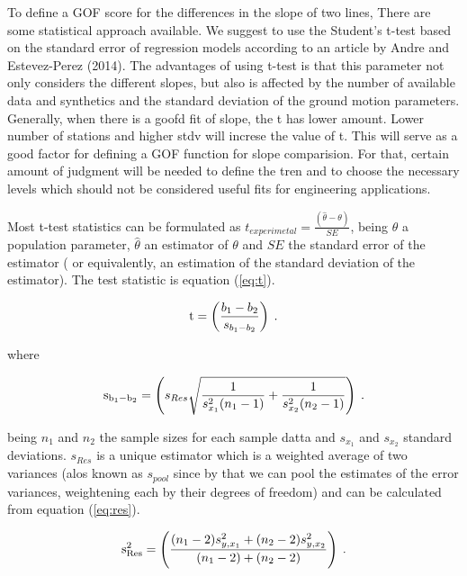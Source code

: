 To define a GOF score for the differences in the slope of two lines, There are some statistical approach available. We suggest to use the Student's t-test based on the standard error of regression models according to an article by Andre and Estevez-Perez (2014). The advantages of using t-test is that this parameter not only considers the different slopes, but also is affected by the number of available data and synthetics and the standard deviation of the ground motion parameters. Generally, when there is a goofd fit of slope, the t has lower amount. Lower number of stations and higher stdv will increse the value of t. This will serve as a good factor for defining a GOF function for slope comparision. For that, certain amount of judgment will be needed to define the tren and to choose the necessary levels which should not be considered useful fits for engineering applications.

Most t-test statistics can be formulated as $t_{experimetal}= \frac{(\hat{\theta}-\theta)}{SE}$, being $\theta$ a population parameter, $\hat{\theta}$ an estimator of ${\theta}$ and $SE$ the standard error of the estimator ( or equivalently, an estimation of the standard deviation of the estimator). The test statistic is equation (\ref{eq:t}).

%
\begin{equation}
	\mathrm{t} = \left( 
		\frac{b_1 - b_2}{s_{b_1-b_2}}
	\right)
	\hspace{0.25em}.
	\label{eq:t}
\end{equation}

where

%
\begin{equation}
	\mathrm{s_{b_1-b_2}} = \left( 
		s_{Res}\sqrt{\frac{1}{s_{x_1}^2(n_1-1)}+\frac{1}{s_{x_2}^2(n_2-1)}}
	\right)
	\hspace{0.25em}.
	\label{eq:sbb}
\end{equation}

being $n_1$ and $n_2$ the sample sizes for each sample datta and $s_{x_1}$ and $s_{x_2}$ standard deviations. $s_{Res}$ is a unique estimator which is a weighted average of two variances (alos known as $s_{pool}$ since by that we can pool the estimates of the error variances, weightening each by their degrees of freedom) and can be calculated from equation (\ref{eq:res}).

%
\begin{equation}
	\mathrm{s_{Res}^2} = \left( 
		\frac{(n_1-2)s_{y,x_1}^2+(n_2-2)s_{y,x_2}^2}{(n_1-2)+(n_2-2)}
	\right)
	\hspace{0.25em}.
	\label{eq:res}
\end{equation}


